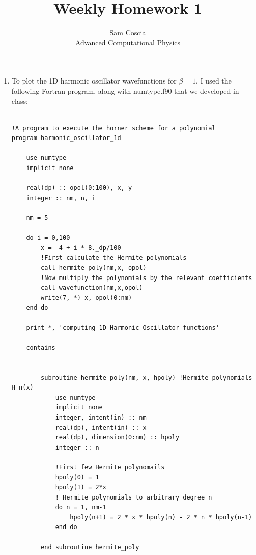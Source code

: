 \documentclass[12pt]{article}
\begin{document}
 
 
\title{Weekly Homework 1}
\author{Sam Coscia\\ %
Advanced Computational Physics}

\maketitle

\begin{enumerate} %
\item  
  To plot the 1D harmonic oscillator wavefunctions for $\beta=1$, I used the following Fortran program, along with numtype.f90 that we developed in class:
  \begin{verbatim}

!A program to execute the horner scheme for a polynomial
program harmonic_oscillator_1d

    use numtype
    implicit none

    real(dp) :: opol(0:100), x, y
    integer :: nm, n, i

    nm = 5
    
    do i = 0,100
        x = -4 + i * 8._dp/100
        !First calculate the Hermite polynomials
        call hermite_poly(nm,x, opol)
        !Now multiply the polynomials by the relevant coefficients
        call wavefunction(nm,x,opol)
        write(7, *) x, opol(0:nm)
    end do

    print *, 'computing 1D Harmonic Oscillator functions'

    contains 


        subroutine hermite_poly(nm, x, hpoly) !Hermite polynomials H_n(x)
            use numtype
            implicit none
            integer, intent(in) :: nm
            real(dp), intent(in) :: x
            real(dp), dimension(0:nm) :: hpoly
            integer :: n

            !First few Hermite polynomails
            hpoly(0) = 1
            hpoly(1) = 2*x
            ! Hermite polynomials to arbitrary degree n
            do n = 1, nm-1
                hpoly(n+1) = 2 * x * hpoly(n) - 2 * n * hpoly(n-1)
            end do

        end subroutine hermite_poly


\end{verbatim}
\end{enumerate}
\end{document}
